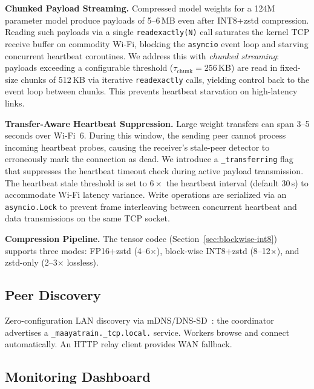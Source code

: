 \documentclass[10pt,conference]{IEEEtran}
\begin{document}
\textbf{Chunked Payload Streaming.} Compressed model weights for a 124M
parameter model produce payloads of 5--6\,MB even after INT8+zstd
compression. Reading such payloads via a single \texttt{readexactly(N)} call
saturates the kernel TCP receive buffer on commodity Wi-Fi, blocking the
\texttt{asyncio} event loop and starving concurrent heartbeat coroutines.
We address this with \emph{chunked streaming}: payloads exceeding a
configurable threshold ($\tau_{\text{chunk}}{=}256$\,KB) are read in
fixed-size chunks of 512\,KB via iterative \texttt{readexactly} calls,
yielding control back to the event loop between chunks. This prevents
heartbeat starvation on high-latency links.

\textbf{Transfer-Aware Heartbeat Suppression.} Large weight transfers can
span 3--5 seconds over Wi-Fi~6. During this window, the sending peer
cannot process incoming heartbeat probes, causing the receiver's stale-peer
detector to erroneously mark the connection as dead. We introduce a
\texttt{\_transferring} flag that suppresses the heartbeat timeout check
during active payload transmission. The heartbeat stale threshold is set to
$6\times$ the heartbeat interval (default 30\,s) to accommodate Wi-Fi
latency variance. Write operations are serialized via an
\texttt{asyncio.Lock} to prevent frame interleaving between concurrent
heartbeat and data transmissions on the same TCP socket.

\textbf{Compression Pipeline.} The tensor codec
(Section~\ref{sec:blockwise-int8}) supports three modes: FP16+zstd
(4--6$\times$), block-wise INT8+zstd (8--12$\times$), and zstd-only
(2--3$\times$ lossless).

\subsection{Peer Discovery}

Zero-configuration LAN discovery via mDNS/DNS-SD~\cite{rfc6762}: the
coordinator advertises a \texttt{\_maayatrain.\_tcp.local.} service. Workers
browse and connect automatically. An HTTP relay client provides WAN
fallback.

\subsection{Monitoring Dashboard}
\end{document}
